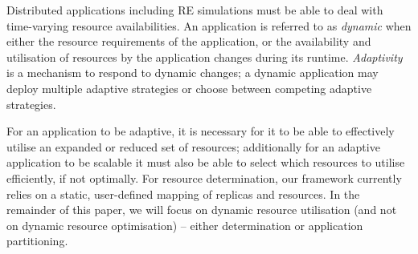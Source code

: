 \documentclass{rspublic}
\newcommand{\glidein}[1]{Glide-In }
\begin{document}
Distributed applications including RE simulations must be able to 
deal with time-varying resource availabilities.
An application is referred to as \emph{dynamic} when either the
resource requirements of the application, or the availability and
utilisation of resources by the application changes during its
runtime.  \emph{Adaptivity} is a mechanism to respond to dynamic
changes; %
a dynamic application may deploy multiple adaptive strategies or
choose between competing adaptive strategies.


For an application to be adaptive, it is necessary for it to be able
to effectively utilise an expanded or reduced set of resources;
additionally for an adaptive application to be scalable it must also
be able to select which resources to utilise efficiently, if not
optimally.  For resource determination, our framework currently relies
on a static, user-defined mapping of replicas and resources.  In the
remainder of this paper, we will focus on dynamic resource utilisation
(and not on dynamic resource optimisation) -- either determination or
application partitioning.



\end{document}
